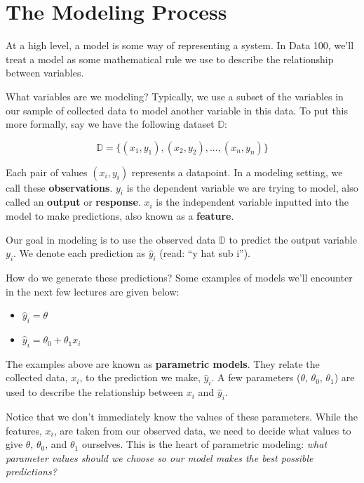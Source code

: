 \documentclass[
  letterpaper,
  DIV=11,
  numbers=noendperiod]{scrreprt}
\providecommand{\tightlist}{%
  \setlength{\itemsep}{0pt}\setlength{\parskip}{0pt}}\usepackage{longtable,booktabs,array}
\begin{document}
\hypertarget{the-modeling-process}{%
\section{The Modeling Process}\label{the-modeling-process}}

At a high level, a model is some way of representing a system. In Data
100, we'll treat a model as some mathematical rule we use to describe
the relationship between variables.

What variables are we modeling? Typically, we use a subset of the
variables in our sample of collected data to model another variable in
this data. To put this more formally, say we have the following dataset
\(\mathbb{D}\):

\[\mathbb{D} = \{(x_1, y_1), (x_2, y_2), ..., (x_n, y_n)\}\]

Each pair of values \((x_i, y_i)\) represents a datapoint. In a modeling
setting, we call these \textbf{observations}. \(y_i\) is the dependent
variable we are trying to model, also called an \textbf{output} or
\textbf{response}. \(x_i\) is the independent variable inputted into the
model to make predictions, also known as a \textbf{feature}.

Our goal in modeling is to use the observed data \(\mathbb{D}\) to
predict the output variable \(y_i\). We denote each prediction as
\(\hat{y}_i\) (read: ``y hat sub i'').

How do we generate these predictions? Some examples of models we'll
encounter in the next few lectures are given below:

\begin{itemize}
\tightlist
\item
  \(\hat{y}_i = \theta\)
\item
  \(\hat{y}_i = \theta_0 + \theta_1 x_i\)
\end{itemize}

The examples above are known as \textbf{parametric models}. They relate
the collected data, \(x_i\), to the prediction we make, \(\hat{y}_i\). A
few parameters (\(\theta\), \(\theta_0\), \(\theta_1\)) are used to
describe the relationship between \(x_i\) and \(\hat{y}_i\).

Notice that we don't immediately know the values of these parameters.
While the features, \(x_i\), are taken from our observed data, we need
to decide what values to give \(\theta\), \(\theta_0\), and \(\theta_1\)
ourselves. This is the heart of parametric modeling: \emph{what
parameter values should we choose so our model makes the best possible
predictions?}
\end{document}
